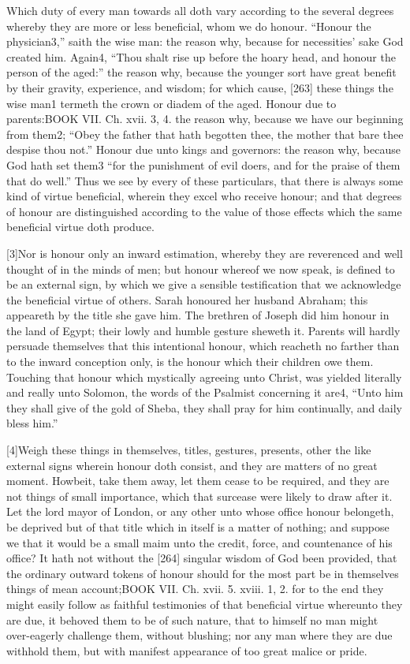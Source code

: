 Which duty of every man towards all doth vary according to the several degrees whereby they are more or less beneficial, whom we do honour. “Honour the physician3,” saith the wise man: the reason why, because for necessities’ sake God created him. Again4, “Thou shalt rise up before the hoary head, and honour the person of the aged:” the reason why, because the younger sort have great benefit by their gravity, experience, and wisdom; for which cause, [263] these things the wise man1 termeth the crown or diadem of the aged. Honour due to parents:BOOK VII. Ch. xvii. 3, 4. the reason why, because we have our beginning from them2; “Obey the father that hath begotten thee, the mother that bare thee despise thou not.” Honour due unto kings and governors: the reason why, because God hath set them3 “for the punishment of evil doers, and for the praise of them that do well.” Thus we see by every of these particulars, that there is always some kind of virtue beneficial, wherein they excel who receive honour; and that degrees of honour are distinguished according to the value of those effects which the same beneficial virtue doth produce.

[3]Nor is honour only an inward estimation, whereby they are reverenced and well thought of in the minds of men; but honour whereof we now speak, is defined to be an external sign, by which we give a sensible testification that we acknowledge the beneficial virtue of others. Sarah honoured her husband Abraham; this appeareth by the title she gave him. The brethren of Joseph did him honour in the land of Egypt; their lowly and humble gesture sheweth it. Parents will hardly persuade themselves that this intentional honour, which reacheth no farther than to the inward conception only, is the honour which their children owe them. Touching that honour which mystically agreeing unto Christ, was yielded literally and really unto Solomon, the words of the Psalmist concerning it are4, “Unto him they shall give of the gold of Sheba, they shall pray for him continually, and daily bless him.”

[4]Weigh these things in themselves, titles, gestures, presents, other the like external signs wherein honour doth consist, and they are matters of no great moment. Howbeit, take them away, let them cease to be required, and they are not things of small importance, which that surcease were likely to draw after it. Let the lord mayor of London, or any other unto whose office honour belongeth, be deprived but of that title which in itself is a matter of nothing; and suppose we that it would be a small maim unto the credit, force, and countenance of his office? It hath not without the [264] singular wisdom of God been provided, that the ordinary outward tokens of honour should for the most part be in themselves things of mean account;BOOK VII. Ch. xvii. 5. xviii. 1, 2. for to the end they might easily follow as faithful testimonies of that beneficial virtue whereunto they are due, it behoved them to be of such nature, that to himself no man might over-eagerly challenge them, without blushing; nor any man where they are due withhold them, but with manifest appearance of too great malice or pride.

